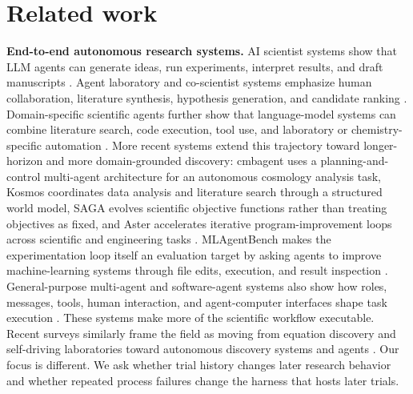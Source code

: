\documentclass{article}
\begin{document}
\section{Related work}

\textbf{End-to-end autonomous research systems.}
AI scientist systems show that LLM agents can generate ideas, run experiments, interpret results, and draft manuscripts \citep{lu2024aiscientistfullyautomated,yamada2025aiscientistv2workshoplevelautomated}. Agent laboratory and co-scientist systems emphasize human collaboration, literature synthesis, hypothesis generation, and candidate ranking \citep{schmidgall2025agentlaboratoryusingllm,gottweis2025aicoscientist,ghareeb2025robinmultiagentautomatingscientific}. Domain-specific scientific agents further show that language-model systems can combine literature search, code execution, tool use, and laboratory or chemistry-specific automation \citep{bran2023chemcrow,boiko2023autonomouschemicalresearch}. More recent systems extend this trajectory toward longer-horizon and more domain-grounded discovery: cmbagent uses a planning-and-control multi-agent architecture for an autonomous cosmology analysis task, Kosmos coordinates data analysis and literature search through a structured world model, SAGA evolves scientific objective functions rather than treating objectives as fixed, and Aster accelerates iterative program-improvement loops across scientific and engineering tasks \citep{xu2025opensourceplanning,mitchener2025kosmos,du2025saga,bicker2026aster}. MLAgentBench makes the experimentation loop itself an evaluation target by asking agents to improve machine-learning systems through file edits, execution, and result inspection \citep{huang2023mlagentbench}. General-purpose multi-agent and software-agent systems also show how roles, messages, tools, human interaction, and agent-computer interfaces shape task execution \citep{wu2023autogen,hong2023metagpt,yang2024sweagent,jimenez2023swebench}. These systems make more of the scientific workflow executable. Recent surveys similarly frame the field as moving from equation discovery and self-driving laboratories toward autonomous discovery systems and agents \citep{kramer2026automatedscientificdiscovery}. Our focus is different. We ask whether trial history changes later research behavior and whether repeated process failures change the harness that hosts later trials.
\end{document}
